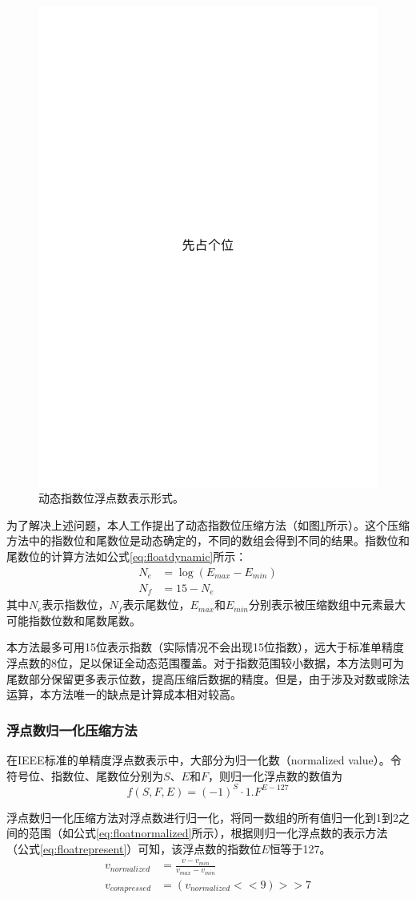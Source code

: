 \documentclass[degree=doctor]{thuthesis}
\begin{document}
\begin{figure}[ht]
\centering
\includegraphics[width=0.3\columnwidth]{figures/placeholder.pdf}
\caption{动态指数位浮点数表示形式。}
\label{fig:ieeefloatdynamic}
\end{figure}

为了解决上述问题，本人工作提出了动态指数位压缩方法（如图\ref{fig:ieeefloatdynamic}所示）。这个压缩方法中的指数位和尾数位是动态确定的，不同的数组会得到不同的结果。指数位和尾数位的计算方法如公式\ref{eq:floatdynamic}所示：
\begin{equation}
  \begin{aligned}
    N_e &= \log(E_{max} - E_{min}) \\
    N_f &= 15 - N_e
  \end{aligned}
  \label{eq:floatdynamic}
\end{equation}
其中$N_e$表示指数位，$N_f$表示尾数位，$E_{max}$和$E_{min}$分别表示被压缩数组中元素最大可能指数位数和尾数尾数。

本方法最多可用15位表示指数（实际情况不会出现15位指数），远大于标准单精度浮点数的8位，足以保证全动态范围覆盖。对于指数范围较小数据，本方法则可为尾数部分保留更多表示位数，提高压缩后数据的精度。但是，由于涉及对数或除法运算，本方法唯一的缺点是计算成本相对较高。

\subsubsection{浮点数归一化压缩方法}
在IEEE标准的单精度浮点数表示中，大部分为归一化数（normalized value）。令符号位、指数位、尾数位分别为$S$、$E$和$F$，则归一化浮点数的数值为
\begin{equation}
  f(S,F,E) = (-1)^S \cdot 1.F^{E-127}
\label{eq:floatrepresent}  
\end{equation}

浮点数归一化压缩方法对浮点数进行归一化，将同一数组的所有值归一化到1到2之间的范围（如公式\ref{eq:floatnormalized}所示），根据则归一化浮点数的表示方法（公式\ref{eq:floatrepresent}）可知，该浮点数的指数位$E$恒等于127。
\begin{equation}
\begin{aligned}
  v_{normalized} &= \frac{v - v_{min}}{v_{max} - v_{min}} \\
  v_{compressed} &= (v_{normalized} << 9) >> 7
\end{aligned}
\label{eq:floatnormalized}
\end{equation}
\end{document}
